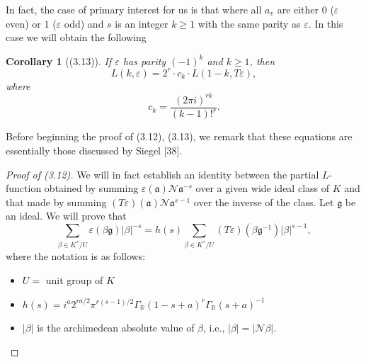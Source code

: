 \documentclass[12pt,a4paper]{article}
\theoremstyle{plain}
\newtheorem{corollary}[theorem]{Corollary}
\theoremstyle{definition}
\newcommand{\R}{\mathbb{R}}
\begin{document}
In fact, the case of primary interest for us is that where all $a_v$ are either $0$ ($\varepsilon$ even) or $1$ ($\varepsilon$ odd) and $s$ is an integer $k\ge1$ with the same parity as $\varepsilon$. In this case we will obtain the following

\begin{corollary}[(3.13)]\label{cor:L-values}
If $\varepsilon$ has parity $(-1)^k$ and $k\ge1$, then
\[
L(k,\varepsilon)=2^{r}\cdot c_k\cdot L(1-k,T\varepsilon),
\]
where
\[
c_k=\frac{(2\pi i)^{rk}}{(k-1)!^r}.
\]
\end{corollary}

Before beginning the proof of (3.12), (3.13), we remark that these equations are essentially those discussed by Siegel [38].

\begin{proof}[Proof of (3.12)]
We will in fact establish an identity between the partial $L$-function obtained by summing $\varepsilon(\mathfrak{a})\mathcal{N}\mathfrak{a}^{-s}$ over a given wide ideal class of $K$ and that made by summing $(T\varepsilon)(\mathfrak{a})\mathcal{N}\mathfrak{a}^{s-1}$ over the inverse of the class. Let $\mathfrak{g}$ be an ideal. We will prove that
\begin{equation}\label{eq:partial}
\sum_{\beta\in K^*/U}\varepsilon(\beta\mathfrak{g})|\beta|^{-s}=h(s)\sum_{\beta\in K^*/U}(T\varepsilon)(\beta\mathfrak{g}^{-1})|\beta|^{s-1},
\end{equation}
where the notation is as follows:
\begin{itemize}[leftmargin=2em]
\item $U=$ unit group of $K$
\item $h(s)=i^{a}2^{ra/2}\pi^{r(s-1)/2}\Gamma_{\R}(1-s+a)^r\Gamma_{\R}(s+a)^{-1}$
\item $|\beta|$ is the archimedean absolute value of $\beta$, i.e., $|\beta|=|\mathcal{N}\beta|$.
\end{itemize}


\end{proof}
\end{document}
